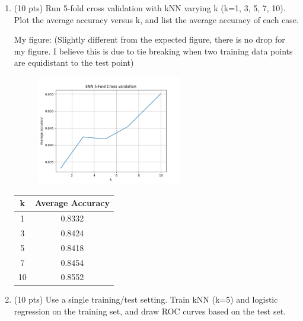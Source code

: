 \documentclass[a4paper]{article}
\theoremstyle{definition}
\newenvironment{soln}{
    \leavevmode\color{blue}\ignorespaces
}{}
\begin{document}
\begin{enumerate}
       \newpage
	\item (10 pts) Run 5-fold cross validation with kNN varying k (k=1, 3, 5, 7, 10). Plot the average accuracy versus k, and list the average accuracy of each case. \\
	\begin{soln} 
        My figure: (Slightly different from the expected figure, there is no drop for my figure. I believe this is due to tie breaking when two training data points are equidistant to the test point)
        \begin{figure}[h]
		\centering
		\includegraphics[width=0.6\textwidth]{images/knn5fold.png}
	\end{figure}
        \begin{center}
            	\begin{tabular}{| c | c |}
            		\hline
            		  k & Average Accuracy \\
            		\hline 1 & 0.8332\\
            		\hline 3 & 0.8424\\
            		\hline 5 & 0.8418\\
            		\hline 7 & 0.8454\\
            		\hline 10 & 0.8552\\
            		\hline
            	\end{tabular}
            \end{center}
        \end{soln}

        \newpage
	\item (10 pts) Use a single training/test setting. Train kNN (k=5) and logistic regression on the training set, and draw ROC curves based on the test set. \\
 

\end{enumerate}
\end{document}
